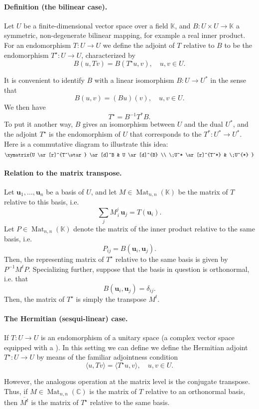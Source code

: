 \documentclass[12pt]{article}
\newcommand{\Mat}{\mathop{\mathrm{Mat}}\nolimits}
\newcommand{\kfield}{\mathbb{K}}
\newcommand{\supt}{^t}
\newcommand{\dual}{^*}
\newcommand{\adj}{^{\displaystyle \star}}
\newcommand{\cnums}{\mathbb{C}}
\newcommand{\bu}{\mathbf{u}}
\begin{document}
\paragraph{Definition (the bilinear case).} Let $U$ be a
finite-dimensional vector space over a field $\kfield$, and $B:U\times
U\to\kfield$ a symmetric, non-degenerate bilinear mapping, for example
a real inner product.  For an endomorphism $T:U\rightarrow U$ we
define the adjoint of $T$ relative to $B$ to be the endomorphism
$T\adj:U\rightarrow U$, characterized by
$$B(u,Tv) = B(T\adj u,v),\quad u,v\in U.$$

It is convenient to identify $B$
with a linear isomorphism $B:U\rightarrow U\dual$ in the sense that
$$B(u,v) = (Bu)(v),\quad u,v\in U.$$
We then have
$$T\adj = B^{-1} T\dual B.$$
To put it another way, $B$ gives an
isomorphism between $U$ and
the dual $U^*$, and  the 
adjoint $T\adj$ is  the endomorphism of $U$  that corresponds to the
$T\dual:U\dual\rightarrow U\dual$.  Here is a commutative diagram to
illustrate this idea:
$$
\xymatrix{%
U \ar[r]^{T^\star} \ar[d]^B & U \ar[d]^{B} \\
\;U^* \ar[r]^{T^*} & \;U^{*}
}
$$


\paragraph{Relation to the matrix transpose.} Let $\bu_1,\ldots,\bu_n$
be a basis of $U$, and let $M\in
\Mat_{n,n}(\kfield)$ be the matrix of $T$ relative to this basis, i.e.
$$\sum_j M^j_{\,i}\, \bu_j = T(\bu_i).$$
Let $P\in\Mat_{n,n}(\kfield)$ denote the matrix of the inner product
relative to the same basis, i.e.
$$P_{ij} = B(\bu_i,\bu_j).$$
Then, the representing matrix of $T\adj$ relative to the same basis
is given by $ P^{-1} M\supt P.$ Specializing further, suppose that the
basis in question is orthonormal, i.e. that
$$B(\bu_i,\bu_j) = \delta_{ij}.$$
Then, the matrix of $T\adj$ is
simply the transpose $M\supt$.

\paragraph{The Hermitian (sesqui-linear) case.}
If $T:U\rightarrow U$ is an endomorphism of a unitary space (a complex
vector space equipped with a ). In this setting we can define we define
the Hermitian adjoint $T\adj:U\rightarrow U$ by means of the familiar
adjointness condition
$$\langle u,Tv\rangle = \langle T\adj u,v\rangle,\quad u,v\in U.$$


However, the analogous operation at the matrix level is the conjugate
transpose. Thus, if $M\in \Mat_{n,n}(\cnums)$ is the matrix of $T$
relative to an orthonormal basis, then $\overline{M\supt}$ is the
matrix of $T\adj$ relative to the same basis.
\end{document}
